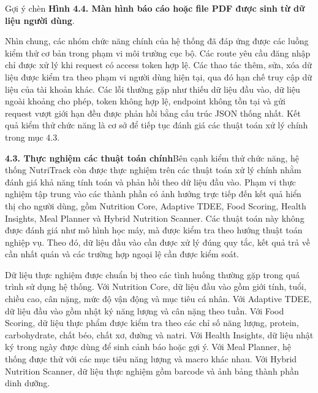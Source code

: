 Gợi ý chèn \textbf{Hình 4.4. Màn hình báo cáo hoặc file PDF được sinh từ dữ liệu người dùng}.

Nhìn chung, các nhóm chức năng chính của hệ thống đã đáp ứng được các luồng kiểm thử cơ bản trong phạm vi môi trường cục bộ. Các route yêu cầu đăng nhập chỉ được xử lý khi request có access token hợp lệ. Các thao tác thêm, sửa, xóa dữ liệu được kiểm tra theo phạm vi người dùng hiện tại, qua đó hạn chế truy cập dữ liệu của tài khoản khác. Các lỗi thường gặp như thiếu dữ liệu đầu vào, dữ liệu ngoài khoảng cho phép, token không hợp lệ, endpoint không tồn tại và gửi request vượt giới hạn đều được phản hồi bằng cấu trúc JSON thống nhất. Kết quả kiểm thử chức năng là cơ sở để tiếp tục đánh giá các thuật toán xử lý chính trong mục 4.3.

\textbf{4.3. Thực nghiệm các thuật toán chính}Bên cạnh kiểm thử chức năng, hệ thống NutriTrack còn được thực nghiệm trên các thuật toán xử lý chính nhằm đánh giá khả năng tính toán và phản hồi theo dữ liệu đầu vào. Phạm vi thực nghiệm tập trung vào các thành phần có ảnh hưởng trực tiếp đến kết quả hiển thị cho người dùng, gồm Nutrition Core, Adaptive TDEE, Food Scoring, Health Insights, Meal Planner và Hybrid Nutrition Scanner. Các thuật toán này không được đánh giá như mô hình học máy, mà được kiểm tra theo hướng thuật toán nghiệp vụ. Theo đó, dữ liệu đầu vào cần được xử lý đúng quy tắc, kết quả trả về cần nhất quán và các trường hợp ngoại lệ cần được kiểm soát.

Dữ liệu thực nghiệm được chuẩn bị theo các tình huống thường gặp trong quá trình sử dụng hệ thống. Với Nutrition Core, dữ liệu đầu vào gồm giới tính, tuổi, chiều cao, cân nặng, mức độ vận động và mục tiêu cá nhân. Với Adaptive TDEE, dữ liệu đầu vào gồm nhật ký năng lượng và cân nặng theo tuần. Với Food Scoring, dữ liệu thực phẩm được kiểm tra theo các chỉ số năng lượng, protein, carbohydrate, chất béo, chất xơ, đường và natri. Với Health Insights, dữ liệu nhật ký trong ngày được dùng để sinh cảnh báo hoặc gợi ý. Với Meal Planner, hệ thống được thử với các mục tiêu năng lượng và macro khác nhau. Với Hybrid Nutrition Scanner, dữ liệu thực nghiệm gồm barcode và ảnh bảng thành phần dinh dưỡng.

